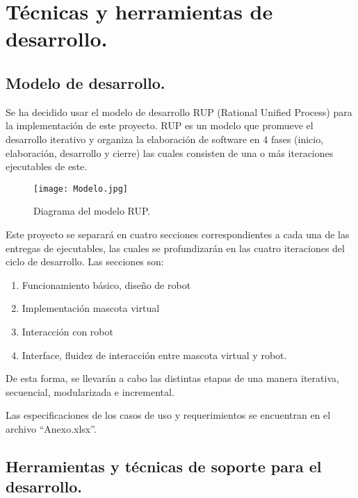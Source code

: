 \chapter{T\'ecnicas y herramientas de desarrollo.}
\newpage

\section{Modelo de desarrollo.}

Se ha decidido usar el modelo de desarrollo RUP (Rational Unified Process) para la implementaci\'on de este proyecto. RUP es un modelo que promueve el desarrollo iterativo y organiza la elaboraci\'on de software en 4 fases (inicio, elaboraci\'on, desarrollo y cierre) las cuales consisten de una o m\'as iteraciones ejecutables de este. 

\begin{figure}[H]
  \centering
  \texttt{[image: Modelo.jpg]}
  \caption[~RUP]{Diagrama del modelo RUP.}
  \label{fig:RUP}
\end{figure}

Este proyecto se separar\'a en cuatro secciones correspondientes a cada una de las entregas de ejecutables, las cuales se profundizar\'an en las cuatro iteraciones del ciclo de desarrollo. Las secciones son:

\begin{enumerate}
\item Funcionamiento b\'asico, dise\~no de robot
\item Implementaci\'on mascota virtual
\item Interacci\'on con robot
\item Interface, fluidez de interacci\'on entre mascota virtual y robot.
\end{enumerate}

De esta forma, se llevar\'an a cabo las distintas etapas de una manera iterativa, secuencial, modularizada e incremental.

Las especificaciones de los casos de uso y requerimientos se encuentran en el archivo ``Anexo.xlsx''.

\newpage
\section{Herramientas y t\'ecnicas de soporte para el de\-sa\-rro\-llo.}

